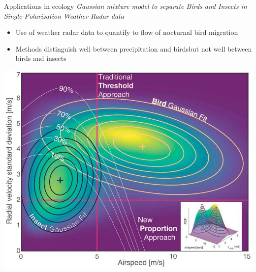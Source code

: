 \documentclass[compress,10pt]{beamer}
\begin{document}
% 
% 
%  




\begin{frame}{Applications in ecology}
\cite{rs13101989}
\emph{Gaussian mixture model to separate Birds and Insects in Single-Polarization Weather Radar data}

\begin{itemize}
 \item Use of weather radar data to quantify to flow of nocturnal bird migration
 \item Methods distinguish well between precipitation and  birdsbut not well between birds and insects
\end{itemize}\centering
\includegraphics[scale=0.13]{WeatherRadar}
\end{frame}
%  
\end{document}
